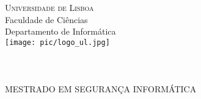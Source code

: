 
\pagestyle{empty}

\begin{center}
\vspace{3cm}\normalfont\normalfont
\textsc{\huge{Universidade de Lisboa}}\\
\LARGE{Faculdade de Ci\^{e}ncias}\\
\Large{Departamento de Inform\'{a}tica}\\
\vspace{1cm}
\texttt{[image: pic/logo\_ul.jpg]}\\

\vspace{2cm}
\PEIIdiomaTese
\Large{\bf \PEITITULO}\\
\vspace{1cm}
\vspace{0.7cm}
\vspace{0.7cm}
\Large{\bf \PEIAutor}\\
\vspace{2.4cm}
\Large{\bf \PEITIPO}\\
\vfill
\Large{MESTRADO EM SEGURANÇA  INFORM\'{A}TICA}\\

\vfill
\PEIAno

\end{center}
\newpage
\mbox{}
\newpage

\setcounter{page}{1}


